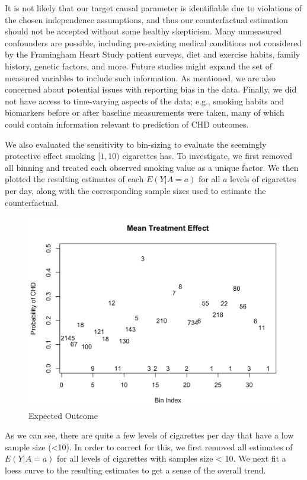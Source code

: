 \documentclass[]{article}
\begin{document}
It is not likely that our target causal parameter is identifiable due to
violations of the chosen independence assumptions, and thus our
counterfactual estimation should not be accepted without some healthy
skepticism. Many unmeasured confounders are possible, including
pre-existing medical conditions not considered by the Framingham Heart
Study patient surveys, diet and exercise habits, family history, genetic
factors, and more. Future studies might expand the set of measured
variables to include such information. As mentioned, we are also
concerned about potential issues with reporting bias in the data.
Finally, we did not have access to time-varying aspects of the data;
e.g., smoking habits and biomarkers before or after baseline
measurements were taken, many of which could contain information
relevant to prediction of CHD outcomes.

We also evaluated the sensitivity to bin-sizing to evaluate the
seemingly protective effect smoking \([1, 10)\) cigarettes has. To
investigate, we first removed all binning and treated each observed
smoking value as a unique factor. We then plotted the resulting
estimates of each \(E(Y | A=a)\) for all \(a\) levels of cigarettes per
day, along with the corresponding sample sizes used to estimate the
counterfactual.

\begin{figure}[H]

{\centering \includegraphics[width=0.5\linewidth]{./effect} 

}

\caption{Expected Outcome}\label{fig:fig5}
\end{figure}

As we can see, there are quite a few levels of cigarettes per day that
have a low sample size (\textless{}10). In order to correct for this, we
first removed all estimates of \(E(Y | A=a )\) for all levels of
cigarettes with samples size \textless{} 10. We next fit a loess curve
to the resulting estimates to get a sense of the overall trend.
\end{document}
